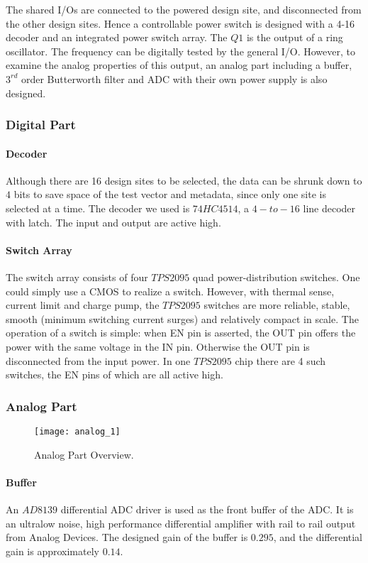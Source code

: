 The shared I/Os are connected to the powered design site, and disconnected from the other design sites. Hence a controllable power switch is designed with a 4-16 decoder and an integrated power switch array. The $Q1$ is the output of a ring oscillator. The frequency can be digitally tested by the general I/O. However, to examine the analog properties of this output, an analog part including a buffer, $3^{rd}$ order Butterworth filter and ADC with their own power supply is also designed.


\subsubsection{Digital Part}

\paragraph{Decoder}
Although there are 16 design sites to be selected, the data can be shrunk down to $4$ bits to save space of the test vector and metadata, since only one site is selected at a time. The decoder we used is $74HC4514$, a $4-to-16$ line decoder with latch. The input and output are active high.

\paragraph{Switch Array}
The switch array consists of four $TPS2095$ quad power-distribution switches. One could simply use a CMOS to realize a switch. However, with thermal sense, current limit and charge pump, the $TPS2095$ switches are more reliable, stable, smooth (minimum switching current surges) and relatively compact in scale. The operation of a switch is simple: when EN pin is asserted, the OUT pin offers the power with the same voltage in the IN pin. Otherwise the OUT pin is disconnected from the input power. In one $TPS2095$ chip there are 4 such switches, the EN pins of which are all active high.


\subsubsection{Analog Part}

\begin{figure}
 \centering
 \texttt{[image: analog\_1]}
 \caption{Analog Part Overview.}
 \label{fig:analog_overview}
\end{figure}

\paragraph{Buffer}
An $AD8139$ differential ADC driver is used as the front buffer of the ADC. It is an ultralow noise, high performance differential amplifier with rail to rail output from Analog Devices. The designed gain of the buffer is $0.295$, and the differential gain is approximately $0.14$.

